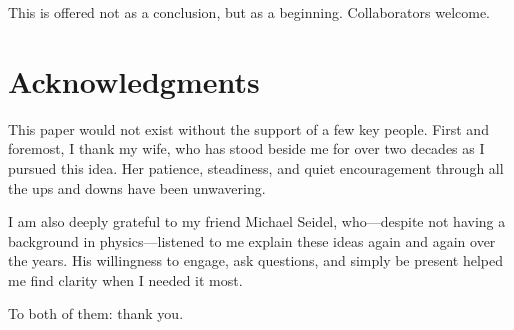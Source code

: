 \documentclass {article}
\begin{document}
This is offered not as a conclusion, but as a beginning. Collaborators welcome.


\section*{Acknowledgments}

This paper would not exist without the support of a few key people. First and foremost, I thank my wife, who has stood beside me for over two decades as I pursued this idea. Her patience, steadiness, and quiet encouragement through all the ups and downs have been unwavering.

I am also deeply grateful to my friend Michael Seidel, who—despite not having a background in physics—listened to me explain these ideas again and again over the years. His willingness to engage, ask questions, and simply be present helped me find clarity when I needed it most.

To both of them: thank you.
\end{document}
